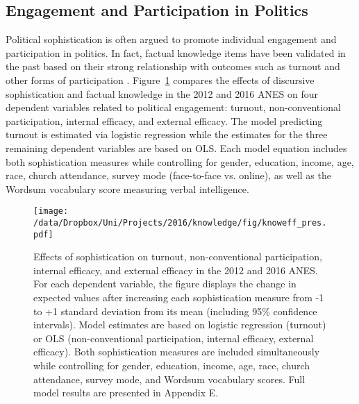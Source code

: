 \subsection{Engagement and Participation in Politics}
Political sophistication is often argued to promote individual engagement and participation in politics. In fact, factual knowledge items have been validated in the past based on their strong relationship with outcomes such as turnout and other forms of participation \citep[c.f.,][230--233]{lupia2015uninformed}. Figure~\ref{fig:knoweff} compares the effects of discursive sophistication and factual knowledge in the 2012 and 2016 ANES on four dependent variables related to political engagement: turnout, non-conventional participation, internal efficacy, and external efficacy. The model predicting turnout is estimated via logistic regression while the estimates for the three remaining dependent variables are based on OLS. Each model equation includes both sophistication measures while controlling for gender, education, income, age, race, church attendance, survey mode (face-to-face vs. online), as well as the Wordsum vocabulary score measuring verbal intelligence.

\begin{figure}[h]\centering
\texttt{[image: /data/Dropbox/Uni/Projects/2016/knowledge/fig/knoweff\_pres.pdf]}
\caption[Effects of sophistication on turnout, non-conventional participation, internal efficacy, and external efficacy in the 2012 and 2016 ANES]{Effects of sophistication on turnout, non-conventional participation, internal efficacy, and external efficacy in the 2012 and 2016 ANES. For each dependent variable, the figure displays the change in expected values after increasing each sophistication measure from -1 to +1 standard deviation from its mean (including 95\% confidence intervals). Model estimates are based on logistic regression (turnout) or OLS (non-conventional participation, internal efficacy, external efficacy). Both sophistication measures are included simultaneously while controlling for gender, education, income, age, race, church attendance, survey mode, and Wordsum vocabulary scores. Full model results are presented in Appendix E.}\label{fig:knoweff}
\end{figure}

